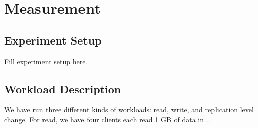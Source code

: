 \section{Measurement}
\label{section:measurement}


\subsection{\bf Experiment Setup}

Fill experiment setup here.

\subsection{\bf Workload Description}
We have run three different kinds of workloads: read, write, and replication level change. For read, we have four clients each read 1 GB of data in ...




